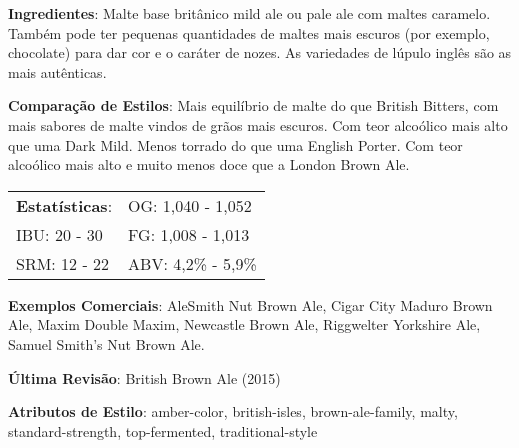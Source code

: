 \textbf{Ingredientes}: Malte base britânico mild ale ou pale ale com maltes caramelo. Também pode ter pequenas quantidades de maltes mais escuros (por exemplo, chocolate) para dar cor e o caráter de nozes. As variedades de lúpulo inglês são as mais autênticas.

\textbf{Comparação de Estilos}: Mais equilíbrio de malte do que British Bitters, com mais sabores de malte vindos de grãos mais escuros. Com teor alcoólico mais alto que uma Dark Mild. Menos torrado do que uma English Porter. Com teor alcoólico mais alto e muito menos doce que a London Brown Ale.

\begin{tabular}{@{}p{35mm}p{35mm}@{}}
  \textbf{Estatísticas}: & OG: 1,040 - 1,052 \\
  IBU: 20 - 30  & FG: 1,008 - 1,013  \\
  SRM: 12 - 22  & ABV: 4,2\% - 5,9\%
\end{tabular}

\textbf{Exemplos Comerciais}: AleSmith Nut Brown Ale, Cigar City Maduro Brown Ale, Maxim Double Maxim, Newcastle Brown Ale, Riggwelter Yorkshire Ale, Samuel Smith’s Nut Brown Ale.

\textbf{Última Revisão}: British Brown Ale (2015)

\textbf{Atributos de Estilo}: amber-color, british-isles, brown-ale-family, malty, standard-strength, top-fermented, traditional-style
